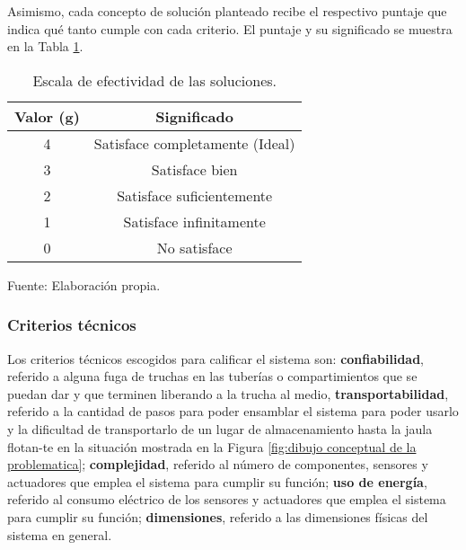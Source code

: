 Asimismo, cada concepto de solución planteado recibe el respectivo puntaje que indica qué tanto cumple con cada criterio. El puntaje y su significado se muestra en la Tabla \ref{tab:escala de efectividad de las soluciones}.

\begin{table}[H]
	\centering
	\caption{Escala de efectividad de las soluciones.}
	\label{tab:escala de efectividad de las soluciones}
	\begin{tabular}{|c|c|}
		\hline
		\rowcolor[HTML]{D9D9D9} 
		\textbf{Valor (g)} & \textbf{Significado} 					\\ \hline
		4                  & Satisface completamente (Ideal)        \\ \hline
		3                  & Satisface bien           				\\ \hline
		2                  & Satisface suficientemente        		\\ \hline
		1                  & Satisface infinitamente     			\\ \hline
		0                  & No satisface				     		\\ \hline
	\end{tabular}
\end{table}
\begin{myflushleftportland2}
	Fuente: Elaboración propia.
\end{myflushleftportland2}


\subsubsection{Criterios técnicos}

Los criterios técnicos escogidos para calificar el sistema son: \textbf{confiabilidad}, referido a alguna fuga de truchas en las tuberías o compartimientos que se puedan dar y que terminen liberando a la trucha al medio, \textbf{transportabilidad}, referido a la cantidad de pasos para poder ensamblar el sistema para poder usarlo y la dificultad de transportarlo de un lugar de almacenamiento hasta la jaula flotan-te en la situación mostrada en la Figura \ref{fig:dibujo conceptual de la problematica}; \textbf{complejidad}, referido al número de componentes, sensores y actuadores que emplea el sistema para cumplir su función; \textbf{uso de energía}, referido al consumo eléctrico de los sensores y actuadores que emplea el sistema para cumplir su función; \textbf{dimensiones}, referido a las dimensiones físicas del sistema en general.

